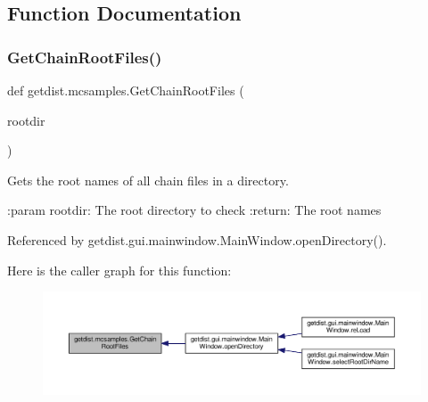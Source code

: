 \subsection{Function Documentation}
\mbox{\label{namespacegetdist_1_1mcsamples_a19b6bbf020742d555e81b6a8bf1475e4}} 
\subsubsection{\texorpdfstring{Get\+Chain\+Root\+Files()}{GetChainRootFiles()}}
{\footnotesize\ttfamily def getdist.\+mcsamples.\+Get\+Chain\+Root\+Files (\begin{DoxyParamCaption}\item[{}]{rootdir }\end{DoxyParamCaption})}

\begin{DoxyVerb}Gets the root names of all chain files in a directory.

:param rootdir: The root directory to check
:return:  The root names
\end{DoxyVerb}
 

Referenced by getdist.\+gui.\+mainwindow.\+Main\+Window.\+open\+Directory().

Here is the caller graph for this function\+:
\nopagebreak
\begin{figure}[H]
\begin{center}
\leavevmode
\includegraphics[width=350pt]{namespacegetdist_1_1mcsamples_a19b6bbf020742d555e81b6a8bf1475e4_icgraph}
\end{center}
\end{figure}
\mbox{\label{namespacegetdist_1_1mcsamples_a16f039cf1d6900bbbf3885c3f4182f81}} 
